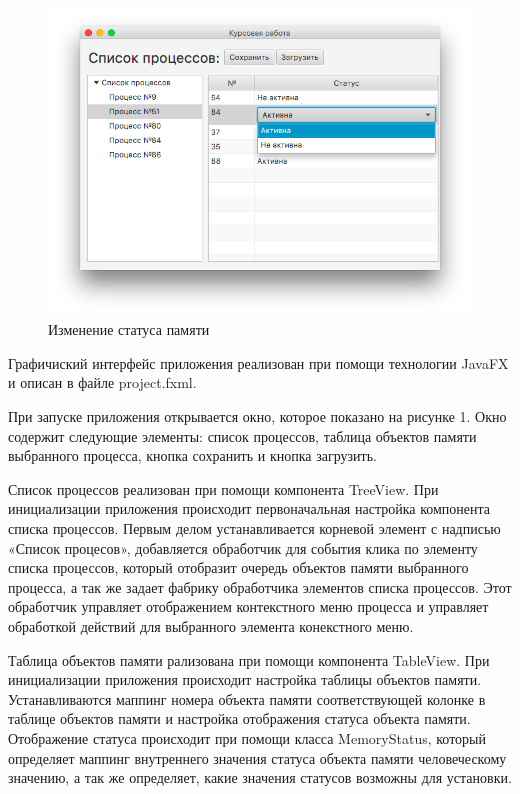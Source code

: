 \documentclass[russian,utf8,simple,hpadding=10mm,vpadding=20mm]{eskdtext}
\begin{document}
\begin{figure}[!h]
    \centering
    \includegraphics[width=1\textwidth]{screenshots/5.png}
    \caption{Изменение статуса памяти}
    \label{fig:mesh5}
\end{figure}

Графичиский интерфейс приложения реализован при помощи технологии JavaFX и описан в файле project.fxml.
 
При запуске приложения открывается окно, которое показано на рисунке 1. Окно содержит следующие элементы: список процессов, таблица объектов памяти выбранного процесса, кнопка сохранить и кнопка загрузить. 

Список процессов реализован при помощи компонента TreeView. При инициализации приложения происходит первоначальная настройка компонента списка процессов. Первым делом устанавливается корневой элемент с надписью «Список процесов», добавляется обработчик для события клика по элементу списка процессов, который отобразит очередь объектов памяти выбранного процесса, а так же задает фабрику обработчика элементов списка процессов. Этот обработчик управляет отображением контекстного меню процесса и управляет обработкой действий для выбранного элемента конекстного меню.

Таблица объектов памяти рализована при помощи компонента TableView. При инициализации приложения происходит настройка таблицы объектов памяти. Устанавливаются маппинг номера объекта памяти соответствующей колонке в таблице объектов памяти и настройка отображения статуса объекта памяти. Отображение статуса происходит при помощи класса MemoryStatus, который определяет маппинг внутреннего значения статуса объекта памяти человеческому значению, а так же определяет, какие значения статусов возможны для установки.
\end{document}
